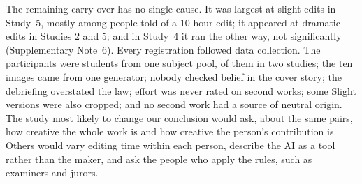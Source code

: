 The remaining carry-over has no single cause. It was largest at slight edits in Study~5, mostly among people told of a 10-hour edit; it appeared at dramatic edits in Studies 2 and 5; and in Study~4 it ran the other way, not significantly (Supplementary Note~6). Every registration followed data collection. The participants were \NPeople{} students from one subject pool, \NPeopleRepeat{} of them in two studies; the ten images came from one generator; nobody checked belief in the cover story; the debriefing overstated the law; effort was never rated on second works; some Slight versions were also cropped; and no second work had a source of neutral origin. The study most likely to change our conclusion would ask, about the same pairs, how creative the whole work is and how creative the person's contribution is. Others would vary editing time within each person, describe the AI as a tool rather than the maker, and ask the people who apply the rules, such as examiners and jurors.
